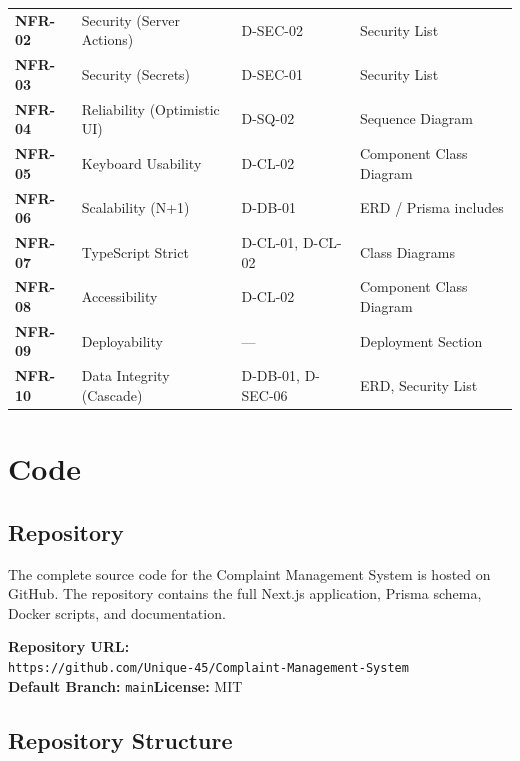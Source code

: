 \documentclass[12pt,a4paper]{report}
\begin{document}
\begin{longtable}{>{\bfseries}p{2.2cm} p{4.5cm} p{3.5cm} p{3.5cm}}
NFR-02 & Security (Server Actions) & D-SEC-02 & Security List \\
NFR-03 & Security (Secrets) & D-SEC-01 & Security List \\
NFR-04 & Reliability (Optimistic UI) & D-SQ-02 & Sequence Diagram \\
NFR-05 & Keyboard Usability & D-CL-02 & Component Class Diagram \\
NFR-06 & Scalability (N+1) & D-DB-01 & ERD / Prisma includes \\
NFR-07 & TypeScript Strict & D-CL-01, D-CL-02 & Class Diagrams \\
NFR-08 & Accessibility & D-CL-02 & Component Class Diagram \\
NFR-09 & Deployability & --- & Deployment Section \\
NFR-10 & Data Integrity (Cascade) & D-DB-01, D-SEC-06 & ERD, Security List \\
\bottomrule
\end{longtable}

\chapter{Code}

\section{Repository}

The complete source code for the Complaint Management System is hosted on
GitHub.  The repository contains the full Next.js application, Prisma schema,
Docker scripts, and documentation.

\begin{tcolorbox}[colback=gray!6,colframe=accent!50,boxrule=0.6pt]
\textbf{Repository URL:}\\[0.5em]
\texttt{https://github.com/Unique-45/Complaint-Management-System}\\[1em]
\textbf{Default Branch:} \texttt{main}\quad\textbf{License:} MIT
\end{tcolorbox}

\section{Repository Structure}
\end{document}
